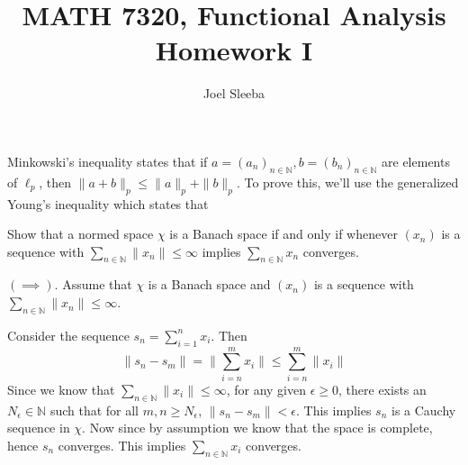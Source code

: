 \documentclass[12pt]{exam}
\theoremstyle{plain} %
\theoremstyle{definition} %
\theoremstyle{remark} %
\begin{document}
\title{MATH 7320, Functional Analysis \\ Homework  I}

\author{
Joel Sleeba \\
}

\maketitle
\printanswers
\unframedsolutions

\begin{questions}
  
  \question
  \begin{solution}
    Minkowski's inequality states that if $a = (a_n)_{n \in \mathbb{N}}, b = (b_n)_{n \in \mathbb{N}}$ are elements of $\ell_p$, then $\|a+b\|_p \le \|a\|_p + \|b\|_p$. To prove this, we'll use the generalized Young's inequality which states that
  \end{solution}

  \question
  \begin{solution}
    
  \end{solution}

  \question
  
  \begin{solution}
    
  \end{solution}

  \question
  
  \begin{solution}
    
  \end{solution}

  \question
    Show that a normed space $\chi$ is a Banach space if and only if whenever $(x_n)$ is a sequence with $\sum_{n \in \mathbb{N}} \|x_n\| \le \infty$ implies $\sum_{n \in \mathbb{N}} x_n$ converges.
  \begin{solution}
    $(\implies)$. Assume that $\chi$ is a Banach space and $(x_n)$ is a sequence with $\sum_{n \in \mathbb{N}} \|x_n\| \le \infty$.

    Consider the sequence $s_n = \sum_{i = 1}^{n} x_i$. Then \[
         \|s_n - s_m\| = \Big\|\sum_{i = n}^{m} x_i\Big\| \le \sum_{i = n}^{m} \|x_i\|
    \]
    Since we know that $ \sum_{n \in \mathbb{N}} \|x_i\| \le \infty$, for any given $ \epsilon \ge 0$, there exists an $N_\epsilon \in \mathbb{N}$ such that for all $ m, n \ge N_\epsilon$, $\|s_n - s_m\| < \epsilon$. This implies $s_n$ is a Cauchy sequence in $\chi$. Now since by assumption we know that the space is complete, hence $s_n$ converges. This implies $ \sum_{n \in \mathbb{N}} x_i$ converges.


\end{solution}
\end{questions}
\end{document}
